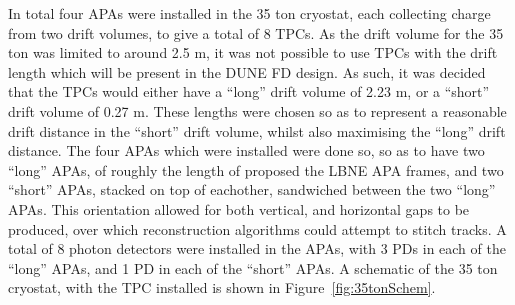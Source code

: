 In total four APAs were installed in the 35 ton cryostat, each collecting charge from two drift volumes, to give a total of 8 TPCs. As the drift volume for the 35 ton was limited to around 2.5 m, it was not possible to use TPCs with the drift length which will be present in the DUNE FD design. As such, it was decided that the TPCs would either have a ``long'' drift volume of 2.23 m, or a ``short'' drift volume of 0.27 m. These lengths were chosen so as to represent a reasonable drift distance in the ``short'' drift volume, whilst also maximising the ``long'' drift distance. The four APAs which were installed were done so, so as to have two ``long'' APAs, of roughly the length of proposed the LBNE APA frames, and two ``short'' APAs, stacked on top of eachother, sandwiched between the two ``long'' APAs. This orientation allowed for both vertical, and horizontal gaps to be produced, over which reconstruction algorithms could attempt to stitch tracks. A total of 8 photon detectors were installed in the APAs, with 3 PDs in each of the ``long'' APAs, and 1 PD in each of the ``short'' APAs. A schematic of the 35 ton cryostat, with the TPC installed is shown in Figure~\ref{fig:35tonSchem}. \\

